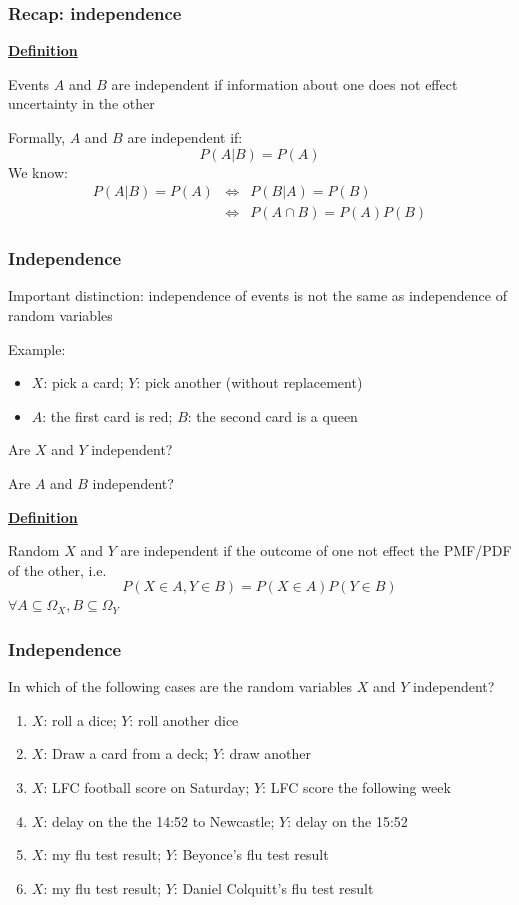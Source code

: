 \documentclass[t,8pt]{beamer}%
\begin{document}
\begin{frame}%
	\frametitle{Recap: independence}
	{\bf\underline{Definition}} \par
	Events $A$ and $B$ are independent if information about one does not effect uncertainty in the other \par
	Formally, $A$ and $B$ are independent if:
	$$P(A\vert B)=P(A)$$
	We know:
        \begin{eqnarray*}
            P(A\vert B)=P(A)&\Leftrightarrow&P(B\vert A)=P(B)\\
            &\Leftrightarrow&P(A\cap B)=P(A)P(B)
        \end{eqnarray*}
\end{frame}

\begin{frame}
    \frametitle{Independence}
    Important distinction: independence of events is not the same as independence of random variables \par
    Example: %
    \begin{itemize}
        \item $X$: pick a card; $Y$: pick another (without replacement)
        \item $A$: the first card is red; $B$: the second card is a queen
    \end{itemize}
    Are $X$ and $Y$ independent? \par
    Are $A$ and $B$ independent? \par
    {\bf\underline{Definition}} \par
    Random $X$ and $Y$ are independent if the outcome of one not effect the PMF/PDF of the other, i.e.
    $$P(X\in A,Y\in B)=P(X\in A)P(Y\in B)$$
    $\forall A\subseteq\Omega_X,B\subseteq\Omega_Y$
\end{frame}

\begin{frame}
	\frametitle{Independence}
	In which of the following cases are the random variables $X$ and $Y$ independent?
	\begin{enumerate}
		\item $X$: roll a dice; $Y$: roll another dice
		\item $X$: Draw a card from a deck; $Y$: draw another
		\item $X$: LFC football score on Saturday; $Y$: LFC score the following week
		\item $X$: delay on the the 14:52 to Newcastle; $Y$: delay on the 15:52
		\item $X$: my flu test result; $Y$: Beyonce's flu test result
		\item $X$: my flu test result; $Y$: Daniel Colquitt's flu test result
	\end{enumerate}
\end{frame}
\end{document}
